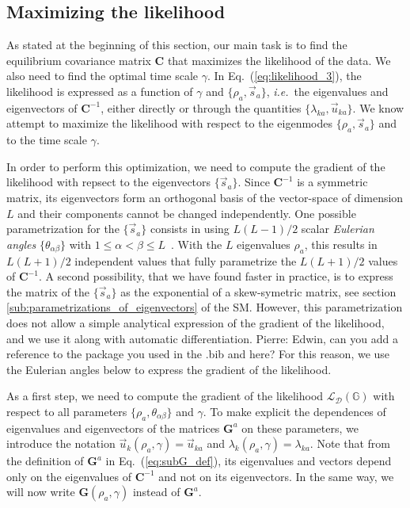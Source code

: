 \documentclass[preprint,amsmath,amssymb,superscriptaddress,showpacs,pre]{revtex4-1}
\newcommand{\ie}{\emph{i.e.}}
\newcommand{\iC}{\bm{C}^{-1}}
\newcommand{\vsa}{\vec{s}_a}
\newcommand{\vuka}{\vec{u}_{ka}}
\newcommand{\pierre}[1]{{\color{red}Pierre: #1}}
\begin{document}

\subsection{Maximizing the likelihood} %
\label{sub:maximization_of_the_likelihood}

As stated at the beginning of this section, our main task is to find the equilibrium covariance matrix $\bm C$ that maximizes the likelihood of the data. 
We also need to find the optimal time scale $\gamma$. 
In Eq.~(\ref{eq:likelihood_3}), the likelihood is expressed as a function of $\gamma$ and $\{\rho_a, \vsa\}$, \ie~the eigenvalues and eigenvectors of $\iC$, either directly or through the quantities $\{\lambda_{ka}, \vuka \}$. 
We know attempt to maximize the likelihood with respect to the eigenmodes $\{\rho_a, \vsa\}$ and to the time scale $\gamma$. 

In order to perform this optimization, we need to compute the gradient of the likelihood with repsect to the eigenvectors $\{\vsa\}$. 
Since $\iC$ is a symmetric matrix, its eigenvectors form an orthogonal basis of the vector-space of dimension $L$ and their components cannot be changed independently.  
One possible parametrization for the $\{\vsa\}$ consists in using $L(L-1)/2$ scalar \emph{Eulerian angles} $\{\theta_{\alpha\beta}\}$ with $1\leq \alpha < \beta \leq L$~\cite{Raffenetti1970GEA, Shepard_param_OM}. 
With the $L$ eigenvalues $\rho_a$, this results in $L(L+1)/2$ independent values that fully parametrize the $L(L+1)/2$ values of $\iC$. 
A second possibility, that we have found faster in practice, is to express the matrix of the $\{\vsa\}$ as the exponential of a skew-symetric matrix, see section \ref{sub:parametrizations_of_eigenvectors} of the SM. 
However, this parametrization does not allow a simple analytical expression of the gradient of the likelihood, and we use it along with automatic differentiation. \pierre{Edwin, can you add a reference to the package you used in the .bib and here?}
For this reason, we use the Eulerian angles below to express the gradient of the likelihood. 

As a first step, we need to compute the gradient of the likelihood $\mathcal{L}_{\mathcal{D}}(\mathbb{G})$ with respect to all parameters $\{\rho_a, \theta_{\alpha\beta}\}$ and $\gamma$. 
To make explicit the dependences of eigenvalues and eigenvectors of the matrices $\bm G^a$ on these parameters, we introduce the notation $\vec{u}_k(\rho_a,\gamma) = \vuka$ and $\lambda_k(\rho_a,\gamma) = \lambda_{ka}$. 
Note that from the definition of $\bm G^a$ in Eq.~(\ref{eq:subG_def}), its eigenvalues and vectors depend only on the eigenvalues of $\iC$ and not on its eigenvectors. 
In the same way, we will now write $\bm G(\rho_a,\gamma)$ instead of $\bm G^a$. 
\end{document}
